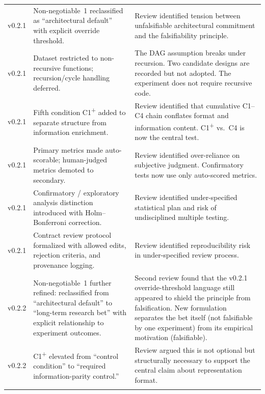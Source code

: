 \documentclass[11pt]{article}
\begin{document}
\begin{longtable}{@{}p{2cm}p{4cm}p{6.5cm}@{}}
  v0.2.1 &
    Non-negotiable~1 reclassified as ``architectural default'' with
    explicit override threshold. &
    Review identified tension between unfalsifiable architectural
    commitment and the falsifiability principle. \\
  \addlinespace

  v0.2.1 &
    Dataset restricted to non-recursive functions; recursion/cycle
    handling deferred. &
    The DAG assumption breaks under recursion.  Two candidate designs
    are recorded but not adopted.  The experiment does not require
    recursive code. \\
  \addlinespace

  v0.2.1 &
    Fifth condition C1\textsuperscript{+} added to separate structure
    from information enrichment. &
    Review identified that cumulative C1--C4 chain conflates format
    and information content.  C1\textsuperscript{+} vs.\ C4 is now
    the central test. \\
  \addlinespace

  v0.2.1 &
    Primary metrics made auto-scorable; human-judged metrics demoted
    to secondary. &
    Review identified over-reliance on subjective judgment.
    Confirmatory tests now use only auto-scored metrics. \\
  \addlinespace

  v0.2.1 &
    Confirmatory / exploratory analysis distinction introduced with
    Holm--Bonferroni correction. &
    Review identified under-specified statistical plan and risk of
    undisciplined multiple testing. \\
  \addlinespace

  v0.2.1 &
    Contract review protocol formalized with allowed edits, rejection
    criteria, and provenance logging. &
    Review identified reproducibility risk in under-specified review
    process. \\
  \addlinespace

  v0.2.2 &
    Non-negotiable~1 further refined: reclassified from
    ``architectural default'' to ``long-term research bet'' with
    explicit relationship to experiment outcomes. &
    Second review found that the v0.2.1 override-threshold language
    still appeared to shield the principle from falsification.  New
    formulation separates the bet itself (not falsifiable by one
    experiment) from its empirical motivation (falsifiable). \\
  \addlinespace

  v0.2.2 &
    C1\textsuperscript{+} elevated from ``control condition'' to
    ``required information-parity control.'' &
    Review argued this is not optional but structurally necessary
    to support the central claim about representation format. \\
  \addlinespace


\end{longtable}
\end{document}
